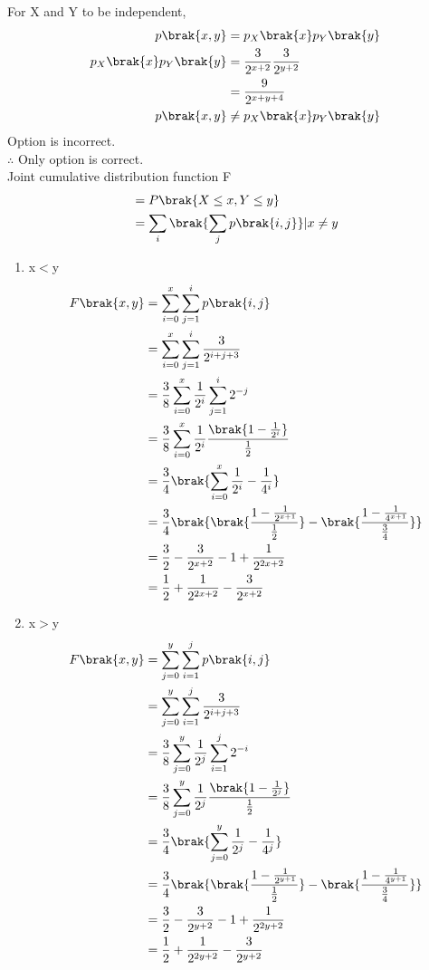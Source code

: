 \documentclass[journal,12pt,twocolumn]{IEEEtran}
\theoremstyle{remark}
\begin{document}
For X and Y to be independent,
\begin{align}
p\brak{x,y}&=p_X\brak{x} p_Y\brak{y}\\
p_X\brak{x} p_Y\brak{y}&=\frac{3}{2^{x+2}}\frac{3}{2^{y+2}}\\
&=\frac{9}{2^{x+y+4}}\\
p\brak{x,y} &\neq p_X\brak{x} p_Y\brak{y}
\end{align}
Option  is incorrect.\\
$\therefore$ Only option  is correct. \\
Joint cumulative distribution function F
\begin{align}
&=P\brak{X\leq x , Y \leq y}\\
&=\sum_i\brak{\sum_j p\brak{i,j}} \vert x \neq y
\end{align}
\begin{enumerate}
\item x$<$y
\begin{align}
F\brak{x,y}&= \sum\limits_{i=0}^{x}\sum\limits^{i}_{j=1} p\brak{i,j}\\
&= \sum\limits_{i=0}^{x}\sum\limits^{i}_{j=1}\frac{3}{2^{i+j+3}}\\
&=\frac{3}{8}\sum\limits_{i=0}^{x}\frac{1}{2^i}\sum\limits_{j=1}^{i} 2^{-j}\\
&=\frac{3}{8}\sum\limits_{i=0}^{x}\frac{1}{2^i}\frac{\brak{1-\frac{1}{2^{i}}}}{\frac{1}{2}}\\
&=\frac{3}{4}\brak{\sum\limits_{i=0}^{x}\frac{1}{2^i}-\frac{1}{4^{i}}}\\
&=\frac{3}{4}\brak{\brak{\frac{1-\frac{1}{2^{x+1}}}{\frac{1}{2}}}-\brak{\frac{1-\frac{1}{4^{x+1}}}{\frac{3}{4}}}}\\
&=\frac{3}{2}-\frac{3}{2^{x+2}}-1+\frac{1}{2^{2x+2}}\\
&=\frac{1}{2}+\frac{1}{2^{2x+2}}-\frac{3}{2^{x+2}}
\end{align}
\item x$>$y
\begin{align}
F\brak{x,y}&= \sum\limits^{y}_{j=0} \sum\limits_{i=1}^{j}p\brak{i,j}\\
&= \sum\limits_{j=0}^{y}\sum\limits^{j}_{i=1}\frac{3}{2^{i+j+3}}\\
&=\frac{3}{8}\sum\limits_{j=0}^{y}\frac{1}{2^j}\sum\limits_{i=1}^{j} 2^{-i}\\
&=\frac{3}{8}\sum\limits_{j=0}^{y}\frac{1}{2^j}\frac{\brak{1-\frac{1}{2^{j}}}}{\frac{1}{2}}\\
&=\frac{3}{4}\brak{\sum\limits_{j=0}^{y}\frac{1}{2^j}-\frac{1}{4^{j}}}\\
&=\frac{3}{4}\brak{\brak{\frac{1-\frac{1}{2^{y+1}}}{\frac{1}{2}}}-\brak{\frac{1-\frac{1}{4^{y+1}}}{\frac{3}{4}}}}\\
&=\frac{3}{2}-\frac{3}{2^{y+2}}-1+\frac{1}{2^{2y+2}}\\
&=\frac{1}{2}+\frac{1}{2^{2y+2}}-\frac{3}{2^{y+2}}
\end{align}
\end{enumerate}
\end{document}

